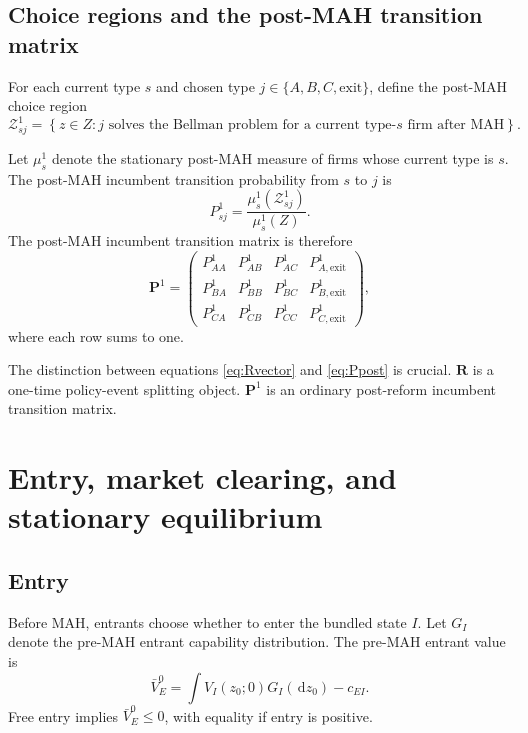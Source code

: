 \documentclass[12pt]{article}
\newcommand{\1}{\mathbf{1}}
\newcommand{\dd}{\,\mathrm{d}}
\begin{document}
\subsection{Choice regions and the post-MAH transition matrix}

For each current type $s$ and chosen type $j\in\{A,B,C,\mathrm{exit}\}$, define the post-MAH choice region
\begin{equation}
\mathcal Z_{sj}^1=\left\{z\in Z: j \text{ solves the Bellman problem for a current type-}s\text{ firm after MAH}\right\}.
\label{eq:choice_region_post}
\end{equation}

Let $\mu_s^1$ denote the stationary post-MAH measure of firms whose current type is $s$. The post-MAH incumbent transition probability from $s$ to $j$ is
\begin{equation}
P_{sj}^1=\frac{\mu_s^1(\mathcal Z_{sj}^1)}{\mu_s^1(Z)}.
\label{eq:transition_prob_post}
\end{equation}
The post-MAH incumbent transition matrix is therefore
\begin{equation}
\mathbf P^1=
\begin{pmatrix}
P_{AA}^1 & P_{AB}^1 & P_{AC}^1 & P_{A,\mathrm{exit}}^1 \\
P_{BA}^1 & P_{BB}^1 & P_{BC}^1 & P_{B,\mathrm{exit}}^1 \\
P_{CA}^1 & P_{CB}^1 & P_{CC}^1 & P_{C,\mathrm{exit}}^1
\end{pmatrix},
\label{eq:Ppost}
\end{equation}
where each row sums to one.

The distinction between equations \eqref{eq:Rvector} and \eqref{eq:Ppost} is crucial. $\mathbf R$ is a one-time policy-event splitting object. $\mathbf P^1$ is an ordinary post-reform incumbent transition matrix.

\section{Entry, market clearing, and stationary equilibrium}

\subsection{Entry}

Before MAH, entrants choose whether to enter the bundled state $I$. Let $G_I$ denote the pre-MAH entrant capability distribution. The pre-MAH entrant value is
\begin{equation}
\bar V_E^0=\int V_I(z_0;0)G_I(\dd z_0)-c_{EI}.
\label{eq:VEpre}
\end{equation}
Free entry implies $\bar V_E^0\le 0$, with equality if entry is positive.
\end{document}
